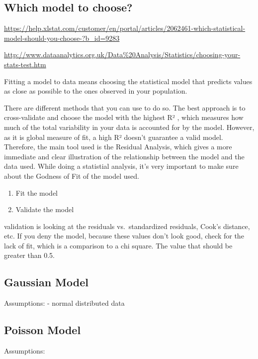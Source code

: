 \documentclass[]{article}
\begin{document}
\subsection{Which model to choose?}\label{which-model-to-choose}

\url{https://help.xlstat.com/customer/en/portal/articles/2062461-which-statistical-model-should-you-choose-?b_id=9283}

\url{http://www.dataanalytics.org.uk/Data\%20Analysis/Statistics/choosing-your-stats-test.htm}

Fitting a model to data means choosing the statistical model that
predicts values as close as possible to the ones observed in your
population.

There are different methods that you can use to do so. The best approach
is to cross-validate and choose the model with the highest R² , which
measures how much of the total variability in your data is accounted for
by the model. However, as it is global measure of fit, a high R² doesn't
guarantee a valid model. Therefore, the main tool used is the Residual
Analysis, which gives a more immediate and clear illustration of the
relationship between the model and the data used. While doing a
statistial analysis, it's very important to make sure about the Godness
of Fit of the model used.

\begin{enumerate}
\def\labelenumi{(\arabic{enumi})}
\item
  Fit the model
\item
  Validate the model
\end{enumerate}

validation is looking at the residuals vs.~standardized residuals,
Cook's distance, etc. If you deny the model, because these values don't
look good, check for the lack of fit, which is a comparison to a chi
square. The value that should be greater than 0.5.

\subsection{Gaussian Model}\label{gaussian-model}

Assumptions: - normal distributed data

\subsection{Poisson Model}\label{poisson-model}

Assumptions:
\end{document}
